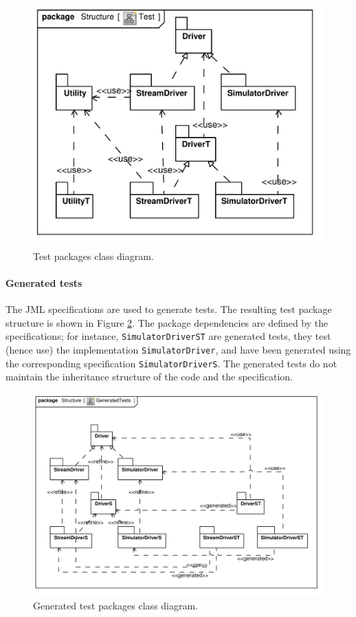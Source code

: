 \documentclass{article}
\newcommand{\lil}[1]{\texttt{\lstinline|#1|}}
\begin{document}
\begin{figure}[htb!]
  \centering
  \includegraphics[scale=0.4]{UML_model/Class_Diagram__Structure__Test}
  \caption{Test packages class diagram.}
  \label{fig:class_diagram_test}
\end{figure}

\paragraph*{Generated tests}

The JML specifications are used to generate tests.
The resulting test package structure is shown in Figure \ref{fig:class_diagram_generatedtest}.  
The package dependencies are defined by the specifications; for instance, \lil{SimulatorDriverST} are generated tests, they test (hence use) the implementation \lil{SimulatorDriver}, and have been generated using the corresponding specification \lil{SimulatorDriverS}.  
The generated tests do not maintain the inheritance structure of the code and the specification.

\begin{figure}[htb!]
  \centering
  \includegraphics[scale=0.7]{UML_model/Class_Diagram__Structure__GeneratedTests}
  \caption{Generated test packages class diagram.}
  \label{fig:class_diagram_generatedtest}
\end{figure}
\end{document}
